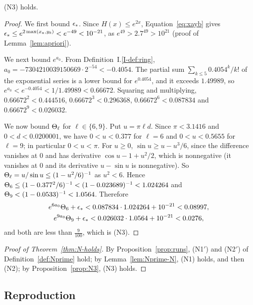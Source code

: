 \begin{proposition}
\label{prop:N3}
\textup{(N3)} holds.
\end{proposition}
\begin{proof}
We first bound $\epsilon_*$. Since $H(x)\le e^{2x}$, Equation~\eqref{eq:xayb} gives
$\epsilon_*\le e^{2\max(x_a,y_b)}<e^{-49}<10^{-21}$, as $e^{49}>2.7^{49}>10^{21}$
(proof of Lemma~\ref{lem:apriori}).

We next bound $e^{a_0}$. From Definition~I.\ref{I-def:ring}, $a_0=-7304210039150669\cdot2^{-54}<-0.4054$. The partial
sum $\sum_{k\le5}0.4054^k/k!$ of the exponential series is a lower bound for
$e^{0.4054}$, and it exceeds $1.49989$, so $e^{a_0}<e^{-0.4054}<1/1.49989<0.66672$.
Squaring and multiplying, $0.66672^2<0.444516$, $0.66672^3<0.296368$,
$0.66672^6<0.087834$ and $0.66672^9<0.026032$.

We now bound $\Theta_{\ell}$ for $\ell\in\{6,9\}$. Put $u=\pi\ell d$. Since $\pi<3.1416$ and $0<d<0.0200001$, we have $0<u<0.377$ for $\ell=6$ and
$0<u<0.5655$ for $\ell=9$; in particular $0<u<\pi$. For $u\ge0$,
$\sin u\ge u-u^3/6$, since the difference vanishes at $0$ and has derivative
$\cos u-1+u^2/2$, which is nonnegative (it vanishes at $0$ and its derivative $u-\sin u$ is
nonnegative). So $\Theta_{\ell}=u/\sin u\le(1-u^2/6)^{-1}$ as
$u^2<6$. Hence $\Theta_{6}\le(1-0.377^2/6)^{-1}<(1-0.023689)^{-1}<1.024264$
and $\Theta_{9}<(1-0.0533)^{-1}<1.0564$. Therefore
\[
\begin{gathered}
e^{6a_0}\Theta_{6}+\epsilon_*<0.087834\cdot1.024264+10^{-21}<0.08997,\\
e^{9a_0}\Theta_{9}+\epsilon_*<0.026032\cdot1.0564+10^{-21}<0.0276,
\end{gathered}
\]
and both are less than $\frac9{100}$, which is \textup{(N3)}.
\end{proof}

\begin{proof}[Proof of Theorem~\ref{thm:N-holds}]
By Proposition~\ref{prop:runs}, \textup{(N1$'$)} and \textup{(N2$'$)} of
Definition~\ref{def:Nprime} hold; by Lemma~\ref{lem:Nprime-N}, \textup{(N1)} holds, and
then \textup{(N2)}; by Proposition~\ref{prop:N3}, \textup{(N3)} holds.
\end{proof}

\subsection{Reproduction}
\label{app:reproduce}

